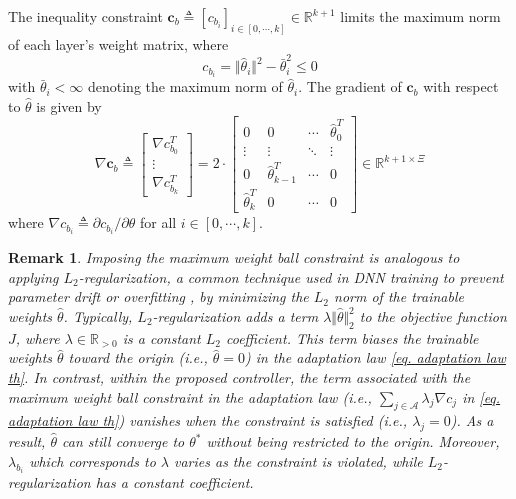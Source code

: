 \documentclass[lettersize,journal]{IEEEtran}
\newtheorem{remark}{Remark}
\begin{document}
The inequality constraint $\mathbf{c}_{b}\triangleq [c_{b_i}]_{i\in[0,\cdots ,k]}\in\mathbb R^{k+1}$ limits the maximum norm of each layer's weight matrix, where
\begin{equation*}
    c_{b_i}=\Vert \hat\theta_i\Vert^2 -\bar\theta_i^2 \le 0
    \label{eq. cstr weight ball}
\end{equation*}
with $\bar\theta_i<\infty$ denoting the maximum norm of $\hat\theta_i$.
The gradient of $\mathbf{c}_b$ with respect to $\hat\theta$ is given by
\begin{equation*}
    \nabla \mathbf c_b 
    \triangleq
    \begin{bmatrix}
        \nabla  c_{b_0}^T
        \\ 
        \vdots 
        \\
        \nabla  c_{b_k}^T
    \end{bmatrix}
    = 2\cdot 
    \begin{bmatrix}
        0&0&\cdots & \hat\theta_0^T\\
        \vdots&\vdots&\ddots&\vdots\\
        0&\hat\theta^T_{k-1}&\cdots &0\\
        \hat\theta^T_k&0&\cdots &0
    \end{bmatrix}
    \in\mathbb R^{k+1\times\Xi}
\end{equation*}
where $\nabla c_{b_i}\triangleq \partial c_{b_i}/\partial \hat\theta$ for all $i \in \left[0,\cdots,k\right]$.

\begin{remark} Imposing the maximum weight ball constraint is analogous to applying $L_2$-regularization, a common technique used in DNN training to prevent parameter drift or overfitting \cite{RN23}, by minimizing the $L_2$ norm of the trainable weights $\hat\theta$. Typically, $L_2$-regularization adds a term $\lambda\Vert\hat\theta\Vert_2^2$ to the objective function $J$, where $\lambda\in\mathbb R_{>0}$ is a constant $L_2$ coefficient. This term biases the trainable weights $\hat\theta$ toward the origin (i.e., $\hat\theta = 0$) in the adaptation law \eqref{eq. adaptation law th}. In contrast, within the proposed controller, the term associated with the maximum weight ball constraint in the adaptation law (i.e., $\sum_{j\in\mathcal{A}}\lambda_j \nabla c_j$ in \eqref{eq. adaptation law th}) vanishes when the constraint is satisfied (i.e., $\lambda_j = 0$).
    As a result, $\hat\theta$ can still converge to $\theta^*$ without being restricted to the origin.
    Moreover, $\lambda_{b_i}$ which corresponds to $\lambda$ varies as the constraint is violated, while $L_2$-regularization has a constant coefficient.
    \label{remark: ball cstr}
\end{remark}
\end{document}
